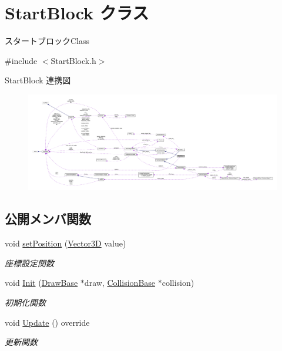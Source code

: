 \hypertarget{class_start_block}{}\section{Start\+Block クラス}
\label{class_start_block}


スタートブロック\+Class  




{\ttfamily \#include $<$Start\+Block.\+h$>$}



Start\+Block 連携図\nopagebreak
\begin{figure}[H]
\begin{center}
\leavevmode
\includegraphics[width=350pt]{class_start_block__coll__graph}
\end{center}
\end{figure}
\subsection*{公開メンバ関数}
\begin{DoxyCompactItemize}
\item 
void \mbox{\hyperlink{class_start_block_a185544c4a670fcbb7259b31ce8088d2a}{set\+Position}} (\mbox{\hyperlink{class_vector3_d}{Vector3D}} value)
\begin{DoxyCompactList}\small\item\em 座標設定関数 \end{DoxyCompactList}\item 
void \mbox{\hyperlink{class_start_block_acdcd2f5baee7e1cbf9e271315d0a83c1}{Init}} (\mbox{\hyperlink{class_draw_base}{Draw\+Base}} $\ast$draw, \mbox{\hyperlink{class_collision_base}{Collision\+Base}} $\ast$collision)
\begin{DoxyCompactList}\small\item\em 初期化関数 \end{DoxyCompactList}\item 
void \mbox{\hyperlink{class_start_block_a89fb4c5fafc1d94155c09ba9b22bb94d}{Update}} () override
\begin{DoxyCompactList}\small\item\em 更新関数 \end{DoxyCompactList}\end{DoxyCompactItemize}
